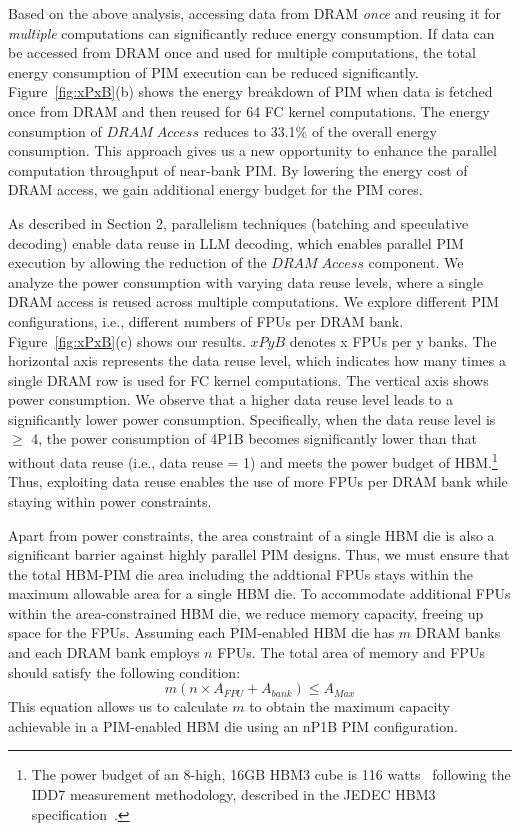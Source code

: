 Based on the above analysis, accessing data from DRAM \emph{once} and reusing it for \emph{multiple} computations can significantly reduce energy consumption. If data can be accessed from DRAM once and used for multiple computations, the total energy consumption of PIM execution can be reduced significantly.
Figure~\ref{fig:xPxB}(b) shows the energy breakdown of PIM when data is fetched once from DRAM and then reused for 64 FC kernel computations.
The energy consumption of $DRAM\;Access$ reduces to 33.1\% of the overall energy consumption. This approach gives us a new opportunity to enhance the parallel computation throughput of near-bank PIM. By lowering the energy cost of DRAM access, we gain additional energy budget for the PIM cores.


As described in Section 2, parallelism techniques (batching and speculative decoding) enable data reuse in LLM decoding, which enables parallel PIM execution by allowing the reduction of the \emph{$DRAM\;Access$} component.
We analyze the power consumption with varying data reuse levels, where a single DRAM access is reused across multiple computations. We explore different PIM configurations, i.e., different numbers of FPUs per DRAM bank. Figure~\ref{fig:xPxB}(c) shows our results. $xPyB$ denotes x FPUs per y banks. The horizontal axis represents the data reuse level, which indicates how many times a single DRAM row is used for FC kernel computations. The vertical axis shows power consumption. We observe that a higher data reuse level leads to a significantly lower power consumption. Specifically, when the data reuse level is $\geq$ 4, the power consumption of 4P1B becomes significantly lower than that without data reuse (i.e., data reuse = 1) and meets the power budget of HBM.\footnote{The power budget of an 8-high, 16GB HBM3 cube is 116 watts~\cite{park2024attacc} following the IDD7 measurement methodology, described in the JEDEC HBM3 specification~\cite{JEDEC}.} Thus, exploiting data reuse enables the use of more FPUs per DRAM bank while staying within power constraints.

Apart from power constraints, the area constraint of a single HBM die is also a significant barrier against highly parallel PIM designs. Thus, we must ensure that the total HBM-PIM die area including the addtional FPUs stays within the maximum allowable area for a single HBM die.
To accommodate additional FPUs within the area-constrained HBM die, we reduce memory capacity, freeing up space for the FPUs.
Assuming each PIM-enabled HBM die has $m$ DRAM banks and each DRAM bank employs $n$ FPUs. The total area of memory and FPUs should satisfy the following condition:
\begin{equation}
    m (n \times A_{FPU} + A_{bank}) \leq A_{Max}
\end{equation}
This equation allows us to calculate $m$ to obtain the maximum capacity achievable in a PIM-enabled HBM die using an nP1B PIM configuration. 

